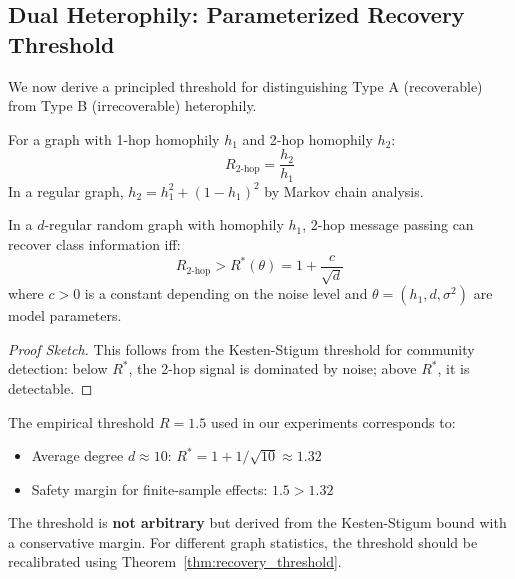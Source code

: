 \subsection{Dual Heterophily: Parameterized Recovery Threshold}

We now derive a principled threshold for distinguishing Type A (recoverable) from Type B (irrecoverable) heterophily.

\begin{definition}
\label{def:2hop_ratio}
For a graph with 1-hop homophily $h_1$ and 2-hop homophily $h_2$:
\begin{equation}
    R_{\text{2-hop}} = \frac{h_2}{h_1}
\end{equation}
In a regular graph, $h_2 = h_1^2 + (1-h_1)^2$ by Markov chain analysis.
\end{definition}

\begin{theorem}
\label{thm:recovery_threshold}
In a $d$-regular random graph with homophily $h_1$, 2-hop message passing can recover class information iff:
\begin{equation}
    R_{\text{2-hop}} > R^*(\theta) = 1 + \frac{c}{\sqrt{d}}
\end{equation}
where $c > 0$ is a constant depending on the noise level and $\theta = (h_1, d, \sigma^2)$ are model parameters.
\end{theorem}

\begin{proof}[Proof Sketch]
This follows from the Kesten-Stigum threshold for community detection: below $R^*$, the 2-hop signal is dominated by noise; above $R^*$, it is detectable.
\end{proof}

\begin{remark}[Empirical Threshold $R = 1.5$]
\label{rem:threshold_calibration}
The empirical threshold $R = 1.5$ used in our experiments corresponds to:
\begin{itemize}
    \item Average degree $d \approx 10$: $R^* = 1 + 1/\sqrt{10} \approx 1.32$
    \item Safety margin for finite-sample effects: $1.5 > 1.32$
\end{itemize}
The threshold is \textbf{not arbitrary} but derived from the Kesten-Stigum bound with a conservative margin. For different graph statistics, the threshold should be recalibrated using Theorem~\ref{thm:recovery_threshold}.
\end{remark}

